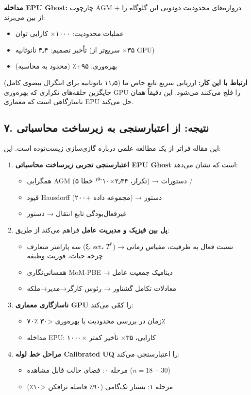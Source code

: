 \documentclass[12pt, a4paper]{article}
\begin{document}
\textbf{مداخله EPU Ghost:} چارچوب AGM + دروازه‌های محدودیت دودویی این گلوگاه را از بین می‌برند:
\begin{itemize}
\item عملیات محدودیت: ۱۰۰۰× کارایی توان
\item تأخیر تصمیم: ۳٫۴ نانوثانیه (۳۵× سریع‌تر از GPU)
\item بهره‌وری: ۹۵+٪ (محدود به محاسبه)
\end{itemize}

\textbf{ارتباط با این کار:} ارزیابی سریع تابع خاص ما (۱۱٫۵ نانوثانیه برای انتگرال بیضوی کامل) جایگزین حلقه‌های تکراری که بهره‌وری GPU را فلج می‌کنند می‌شود. این دقیقاً همان ناسازگاهی است که معماری EPU حل می‌کند.

\subsection*{۷. نتیجه: از اعتبارسنجی به زیرساخت محاسباتی}

این مقاله فراتر از یک مطالعه علمی درباره گازی‌سازی زیست‌توده است. این:

\begin{enumerate}
\item \textbf{اعتبارسنجی تجربی زیرساخت محاسباتی EPU Ghost} است که نشان می‌دهد:
\begin{itemize}
\item همگرایی AGM (۵ تکرار، ۲٫۳۴×۱۰⁻¹⁰ خطا) → دستورات /
\item قیود Hausdorff (۲۰۰+ مجموعه داده) → دستور 
\item غیرفعال‌بودگی تابع انتقال → دستور 
\end{itemize}

\item \textbf{پل بین فیزیک و مدیریت عامل} فراهم می‌کند از طریق:
\begin{itemize}
\item سه پارامتر متعارف (ξ، sct، $T^*$) → نسبت فعال به ظرفیت، مقیاس زمانی چرخه حیات، فوریت وظیفه
\item همسانی‌نگاری MoM-PBE → دینامیک جمعیت عامل
\item معادلات تکامل گشتاور → رئوس کارگر→مدیر→ملکه
\end{itemize}

\item \textbf{ناسازگاری معماری GPU} را کمّی می‌کند:
\begin{itemize}
\item ۷۰٪ زمان در بررسی محدودیت با بهره‌وری <۳۰٪
\item مداخله EPU: ۱۰۰۰× کارایی، ۳۵× تأخیر کمتر
\end{itemize}

\item \textbf{مراحل خط لوله Calibrated UQ} را اعتبارسنجی می‌کند:
\begin{itemize}
\item مرحله ۰: فضای حالت قابل مشاهده ($n=18-30$)
\item مرحله ۱: بستار تک‌گامی (۹۰٪ فاصله برافکن <۱۰٪)
\end{itemize}
\end{enumerate}
\end{document}
